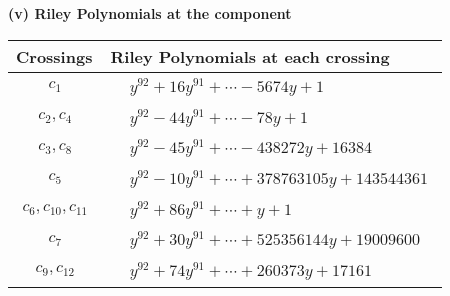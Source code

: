 \documentclass[1p]{elsarticle_modified}
\theoremstyle{definition}
\begin{document}
\newpage\renewcommand{\arraystretch}{1}
\flushleft \textbf{(v) Riley Polynomials at the component}\newline \\
\begin{tabular}{m{50pt}|m{274pt}}
Crossings & \hspace{64pt}Riley Polynomials at each crossing \\
\hline $$\begin{aligned}c_{1}\end{aligned}$$&$\begin{aligned}
&y^{92}+16 y^{91}+\cdots-5674 y+1
\end{aligned}$\\
\hline $$\begin{aligned}c_{2},c_{4}\end{aligned}$$&$\begin{aligned}
&y^{92}-44 y^{91}+\cdots-78 y+1
\end{aligned}$\\
\hline $$\begin{aligned}c_{3},c_{8}\end{aligned}$$&$\begin{aligned}
&y^{92}-45 y^{91}+\cdots-438272 y+16384
\end{aligned}$\\
\hline $$\begin{aligned}c_{5}\end{aligned}$$&$\begin{aligned}
&y^{92}-10 y^{91}+\cdots+378763105 y+143544361
\end{aligned}$\\
\hline $$\begin{aligned}c_{6},c_{10},c_{11}\end{aligned}$$&$\begin{aligned}
&y^{92}+86 y^{91}+\cdots+y+1
\end{aligned}$\\
\hline $$\begin{aligned}c_{7}\end{aligned}$$&$\begin{aligned}
&y^{92}+30 y^{91}+\cdots+525356144 y+19009600
\end{aligned}$\\
\hline $$\begin{aligned}c_{9},c_{12}\end{aligned}$$&$\begin{aligned}
&y^{92}+74 y^{91}+\cdots+260373 y+17161
\end{aligned}$\\
\hline
\end{tabular}\\~\\
\end{document}
